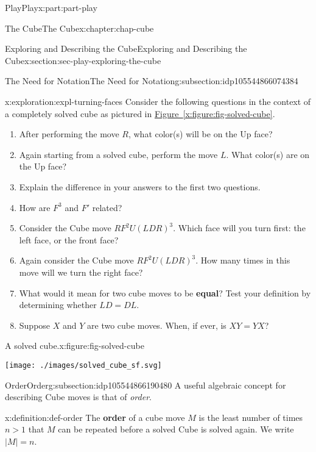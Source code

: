 \documentclass[oneside,10pt,]{book}
\newcommand{\xreffont}{\relax}
\newcommand{\terminology}[1]{\textbf{#1}}
\numberwithin{equation}{section}
\newcommand{\gt}{>}
\begin{document}
\begin{partptx}{Play}{}{Play}{}{}{x:part:part-play}
\begin{chapterptx}{The Cube}{}{The Cube}{}{}{x:chapter:chap-cube}
\begin{sectionptx}{Exploring and Describing the Cube}{}{Exploring and Describing the Cube}{}{}{x:section:sec-play-exploring-the-cube}
\begin{subsectionptx}{The Need for Notation}{}{The Need for Notation}{}{}{g:subsection:idp105544866074384}
\begin{exploration}{}{x:exploration:expl-turning-faces}%
Consider the following questions in the context of a completely solved cube as pictured in \hyperref[x:figure:fig-solved-cube]{Figure~{\xreffont\ref{x:figure:fig-solved-cube}}}.%
%
\begin{enumerate}
\item{}After performing the move \(R\), what color(s) will be on the Up face?%
\item{}Again starting from a solved cube, perform the move \(L\). What color(s) are on the Up face?%
\item{}Explain the difference in your answers to the first two questions.%
\item{}How are \(F^3\) and \(F'\) related?%
\item{}Consider the Cube move \(RF^2 U (LDR)^3\). Which face will you turn first: the left face, or the front face?%
\item{}Again consider the Cube move \(RF^2 U (LDR)^3\). How many times in this move will we turn the right face?%
\item{}What would it mean for two cube moves to be \terminology{equal}? Test your definition by determining whether \(LD = DL\).%
\item{}Suppose \(X\) and \(Y\) are two cube moves. When, if ever, is \(XY = YX\)?%
\end{enumerate}
\begin{figureptx}{A solved cube.}{x:figure:fig-solved-cube}{}%
\begin{image}{0.25}{0.5}{0.25}%
\texttt{[image: ./images/solved\_cube\_sf.svg]}
\end{image}%
\tcblower
\end{figureptx}%
\end{exploration}%
\end{subsectionptx}
%
%
\typeout{************************************************}
\typeout{************************************************}
%
\begin{subsectionptx}{Order}{}{Order}{}{}{g:subsection:idp105544866190480}
A useful algebraic concept for describing Cube moves is that of \emph{order}.%
\begin{definition}{}{x:definition:def-order}%
%
The \terminology{order} of a cube move \(M\) is the least number of times \(n \gt 1\) that \(M\) can be repeated before a solved Cube is solved again. We write \(|M| = n\).%
\end{definition}

\end{subsectionptx}
\end{sectionptx}
\end{chapterptx}
\end{partptx}
\end{document}
